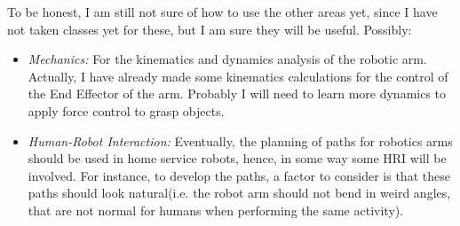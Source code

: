 \documentclass[10pt,a4paper]{article}
\begin{document}
To be honest, I am still not sure of how to use the other areas yet, since I have not taken classes yet for these, but I am sure they will be useful. Possibly:

\begin{itemize}
\item{\textit{Mechanics:} For the kinematics and dynamics analysis of the robotic arm. Actually, I have already made some kinematics calculations for the control of the End Effector of the arm. Probably I will need to learn more dynamics to apply force control to grasp objects.}
\item{\textit{Human-Robot Interaction:} Eventually, the planning of paths for robotics arms should be used in home service robots, hence, in some way some HRI will be involved. For instance, to develop the paths, a factor to consider is that these paths should look natural(i.e. the robot arm should not bend in weird angles, that are not normal for humans when performing the same activity).}
\end{itemize}
\end{document}
